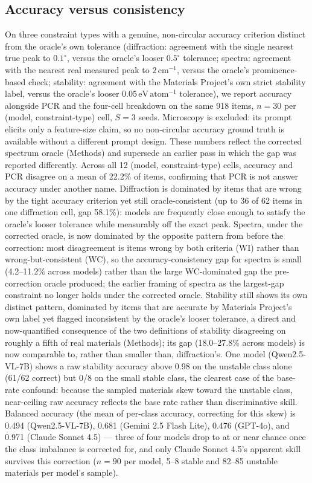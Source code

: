 \documentclass[pdflatex,sn-nature]{sn-jnl}
\begin{document}
\subsection*{Accuracy versus consistency}
On three constraint types with a genuine, non-circular accuracy criterion distinct
from the oracle's own tolerance (diffraction: agreement with the single nearest true
peak to $0.1^{\circ}$, versus the oracle's looser $0.5^{\circ}$ tolerance; spectra:
agreement with the nearest real measured peak to $2\,\mathrm{cm}^{-1}$, versus the
oracle's prominence-based check; stability: agreement with the Materials Project's own
strict stability label, versus the oracle's looser $0.05\,\mathrm{eV\,atom^{-1}}$
tolerance), we report accuracy alongside PCR and the four-cell breakdown on the same
918 items, $n=30$ per (model, constraint-type) cell, $S=3$ seeds. Microscopy is excluded: its
prompt elicits only a feature-size claim, so no non-circular accuracy ground truth is
available without a different prompt design. These numbers reflect the corrected
spectrum oracle (Methods) and supersede an earlier pass in which the gap was reported
differently. Across all 12 (model, constraint-type) cells,
accuracy and PCR disagree on a mean of 22.2\% of items, confirming that PCR is not
answer accuracy under another name. Diffraction is dominated by items
that are wrong by the tight accuracy criterion yet still oracle-consistent (up to 36
of 62 items in one diffraction cell, gap 58.1\%): models are frequently close enough to satisfy the
oracle's looser tolerance while measurably off the exact peak. Spectra, under the corrected
oracle, is now dominated by the opposite pattern from before the correction: most
disagreement is items wrong by both criteria (WI) rather than wrong-but-consistent (WC),
so the accuracy-consistency gap for spectra is small (4.2--11.2\% across models) rather
than the large WC-dominated gap the pre-correction oracle produced; the earlier framing of
spectra as the largest-gap constraint no longer holds under the corrected oracle. Stability
still shows its own distinct pattern, dominated by items that are accurate by Materials
Project's own label yet flagged inconsistent by the oracle's looser tolerance, a direct
and now-quantified consequence of the two definitions of stability disagreeing on roughly
a fifth of real materials (Methods); its gap (18.0--27.8\% across models) is now
comparable to, rather than smaller than, diffraction's. One model (Qwen2.5-VL-7B) shows a raw stability accuracy
above 0.98 on the unstable class alone (61/62 correct) but 0/8 on the small stable
class, the clearest case of the base-rate confound: because the sampled materials skew
toward the unstable class, near-ceiling raw accuracy reflects the base rate rather than
discriminative skill. Balanced accuracy (the mean of per-class accuracy, correcting for
this skew) is 0.494 (Qwen2.5-VL-7B), 0.681 (Gemini 2.5 Flash Lite), 0.476 (GPT-4o), and
0.971 (Claude Sonnet 4.5) --- three of four models drop to at or near chance once the
class imbalance is corrected for, and only Claude Sonnet 4.5's apparent skill survives
this correction ($n=90$ per model, 5--8 stable and 82--85 unstable materials per model's
sample).
\end{document}
